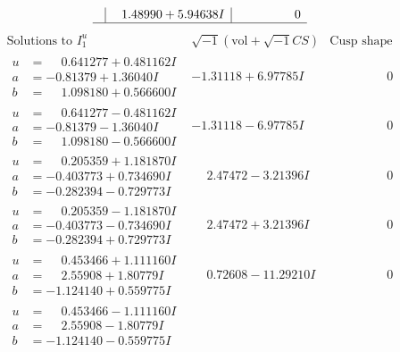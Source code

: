 \documentclass[1p]{elsarticle_modified}
\theoremstyle{definition}
\newcommand{\I}{\sqrt{-1}}
\begin{document}
$$\begin{array}{c|c|c}
 & \phantom{-}1.48990 + 5.94638 I & \phantom{-0.000000 } 0\\
 \hline 
 \end{array}$$\newpage$$\begin{array}{c|c|c}  
\text{Solutions to }I^u_{1}& \I (\text{vol} + \sqrt{-1}CS) & \text{Cusp shape}\\
 \hline 
\begin{aligned}
u &= \phantom{-}0.641277 + 0.481162 I \\
a &= -0.81379 + 1.36040 I \\
b &= \phantom{-}1.098180 + 0.566600 I\end{aligned}
 & -1.31118 + 6.97785 I & \phantom{-0.000000 } 0 \\ \hline\begin{aligned}
u &= \phantom{-}0.641277 - 0.481162 I \\
a &= -0.81379 - 1.36040 I \\
b &= \phantom{-}1.098180 - 0.566600 I\end{aligned}
 & -1.31118 - 6.97785 I & \phantom{-0.000000 } 0 \\ \hline\begin{aligned}
u &= \phantom{-}0.205359 + 1.181870 I \\
a &= -0.403773 + 0.734690 I \\
b &= -0.282394 - 0.729773 I\end{aligned}
 & \phantom{-}2.47472 - 3.21396 I & \phantom{-0.000000 } 0 \\ \hline\begin{aligned}
u &= \phantom{-}0.205359 - 1.181870 I \\
a &= -0.403773 - 0.734690 I \\
b &= -0.282394 + 0.729773 I\end{aligned}
 & \phantom{-}2.47472 + 3.21396 I & \phantom{-0.000000 } 0 \\ \hline\begin{aligned}
u &= \phantom{-}0.453466 + 1.111160 I \\
a &= \phantom{-}2.55908 + 1.80779 I \\
b &= -1.124140 + 0.559775 I\end{aligned}
 & \phantom{-}0.72608 - 11.29210 I & \phantom{-0.000000 } 0 \\ \hline\begin{aligned}
u &= \phantom{-}0.453466 - 1.111160 I \\
a &= \phantom{-}2.55908 - 1.80779 I \\
b &= -1.124140 - 0.559775 I\end{aligned}

\end{array}$$
\end{document}
